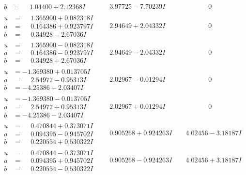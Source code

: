 \documentclass[1p]{elsarticle_modified}
\theoremstyle{definition}
\begin{document}
$$\begin{array}{c|c|c}
\begin{aligned}
b &= \phantom{-}1.04400 + 2.12368 I\end{aligned}
 & \phantom{-}3.97725 - 7.70239 I & \phantom{-0.000000 } 0 \\ \hline\begin{aligned}
u &= \phantom{-}1.365900 + 0.082318 I \\
a &= \phantom{-}0.164386 + 0.923797 I \\
b &= \phantom{-}0.34928 - 2.67036 I\end{aligned}
 & \phantom{-}2.94649 + 2.04332 I & \phantom{-0.000000 } 0 \\ \hline\begin{aligned}
u &= \phantom{-}1.365900 - 0.082318 I \\
a &= \phantom{-}0.164386 - 0.923797 I \\
b &= \phantom{-}0.34928 + 2.67036 I\end{aligned}
 & \phantom{-}2.94649 - 2.04332 I & \phantom{-0.000000 } 0 \\ \hline\begin{aligned}
u &= -1.369380 + 0.013705 I \\
a &= \phantom{-}2.54977 - 0.95313 I \\
b &= -4.25386 + 2.03407 I\end{aligned}
 & \phantom{-}2.02967 - 0.01294 I & \phantom{-0.000000 } 0 \\ \hline\begin{aligned}
u &= -1.369380 - 0.013705 I \\
a &= \phantom{-}2.54977 + 0.95313 I \\
b &= -4.25386 - 2.03407 I\end{aligned}
 & \phantom{-}2.02967 + 0.01294 I & \phantom{-0.000000 } 0 \\ \hline\begin{aligned}
u &= \phantom{-}0.470844 + 0.373071 I \\
a &= \phantom{-}0.094395 - 0.945702 I \\
b &= \phantom{-}0.220554 + 0.530322 I\end{aligned}
 & \phantom{-}0.905268 + 0.924263 I & \phantom{-}4.02456 - 3.18187 I \\ \hline\begin{aligned}
u &= \phantom{-}0.470844 - 0.373071 I \\
a &= \phantom{-}0.094395 + 0.945702 I \\
b &= \phantom{-}0.220554 - 0.530322 I\end{aligned}
 & \phantom{-}0.905268 - 0.924263 I & \phantom{-}4.02456 + 3.18187 I \\ \hline\begin{aligned}

\end{aligned}
\end{array}$$
\end{document}

